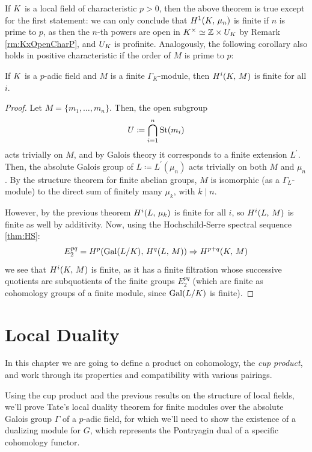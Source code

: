 \documentclass[a4paper, oneside]{memoir}
\begin{document}
\begin{remark}\label{rm:H1CharP}
	If $K$ is a local field of characteristic $p>0$, then the above theorem is true except for the first statement: we can only conclude that $H^{1}( K, \, \mu_n )$ is finite if $n$ is prime to $p$, as then the $n$-th powers are open in $K^\times\simeq\mathbb{Z}\times U_K$ by Remark \ref{rm:KxOpenCharP}, and $U_K$ is profinite. Analogously, the following corollary also holds in positive characteristic if the order of $M$ is prime to $p$:
\end{remark}

\begin{corollary}\label{cor:FinCohom}
	If $K$ is a $p$-adic field and $M$ is a finite $\Gamma_K$-module, then
	\(H^{i}( K, \, M )\) is finite for all $i$.
\end{corollary}
\begin{proof}
	Let $M=\{m_1,\ldots,m_n\}$. Then, the open subgroup
	\[
		U\coloneqq \bigcap_{i=1}^n{\operatorname{St}(m_i)}
	\]
	acts trivially on $M$, and by Galois theory it corresponds to a finite extension $L^{\prime} $. Then, the absolute Galois group of $L\coloneqq L^{\prime}(\mu_n)$ acts trivially on both $M$ and $\mu_n$. By the structure theorem for finite abelian groups, $M$ is isomorphic (as a $\Gamma_L$-module) to the direct sum of finitely many $\mu_k$, with $k\mid n$.

	However, by the previous theorem $H^{i}( L, \, \mu_k )$ is finite for all $i$, so $H^{i}( L, \, M )$ is finite as well by additivity. Now, using the Hochschild-Serre spectral sequence \eqref{thm:HS}:
	\[
		E_2^{pq}= H^{p}( \mathrm{Gal}{(L / K)}, \, H^{q}( L, \, M ) ) \Rightarrow H^{p+q}( K, \, M )
	\]
	we see that $H^{i}( K, \, M )$ is finite, as it has a finite filtration whose successive quotients are subquotients of the finite groups $E_2^{pq}$ (which are finite as cohomology groups of a finite module, since $\mathrm{Gal}(L /K)$ is finite).
\end{proof}




\chapter{Local Duality}
In this chapter we are going to define a product on cohomology, the \textit{cup product}, and work through its properties and compatibility with various pairings.

Using the cup product and the previous results on the structure of local fields, we'll prove Tate's local duality theorem for finite modules over the absolute Galois group $\Gamma$ of a $p$-adic field, for which we'll need to show the existence of a dualizing module for $G$, which represents the Pontryagin dual of a specific cohomology functor.
\end{document}
